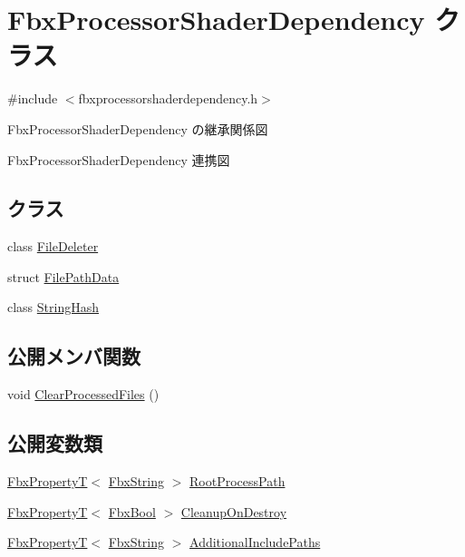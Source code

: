 \hypertarget{class_fbx_processor_shader_dependency}{}\section{Fbx\+Processor\+Shader\+Dependency クラス}
\label{class_fbx_processor_shader_dependency}


{\ttfamily \#include $<$fbxprocessorshaderdependency.\+h$>$}



Fbx\+Processor\+Shader\+Dependency の継承関係図


Fbx\+Processor\+Shader\+Dependency 連携図
\subsection*{クラス}
\begin{DoxyCompactItemize}
\item 
class \hyperlink{class_fbx_processor_shader_dependency_1_1_file_deleter}{File\+Deleter}
\item 
struct \hyperlink{struct_fbx_processor_shader_dependency_1_1_file_path_data}{File\+Path\+Data}
\item 
class \hyperlink{class_fbx_processor_shader_dependency_1_1_string_hash}{String\+Hash}
\end{DoxyCompactItemize}
\subsection*{公開メンバ関数}
\begin{DoxyCompactItemize}
\item 
void \hyperlink{class_fbx_processor_shader_dependency_a3c93c344271aa09caf870e35597a7b6a}{Clear\+Processed\+Files} ()
\end{DoxyCompactItemize}
\subsection*{公開変数類}
\begin{DoxyCompactItemize}
\item 
\hyperlink{class_fbx_property_t}{Fbx\+PropertyT}$<$ \hyperlink{class_fbx_string}{Fbx\+String} $>$ \hyperlink{class_fbx_processor_shader_dependency_a2609315b13014fbba8003185c2e8a5f1}{Root\+Process\+Path}
\item 
\hyperlink{class_fbx_property_t}{Fbx\+PropertyT}$<$ \hyperlink{fbxtypes_8h_a92e0562b2fe33e76a242f498b362262e}{Fbx\+Bool} $>$ \hyperlink{class_fbx_processor_shader_dependency_af0bbb628b8b548365fd7d4325f1d4589}{Cleanup\+On\+Destroy}
\item 
\hyperlink{class_fbx_property_t}{Fbx\+PropertyT}$<$ \hyperlink{class_fbx_string}{Fbx\+String} $>$ \hyperlink{class_fbx_processor_shader_dependency_a2ee0459a8761ec48aa6943cc90442b6a}{Additional\+Include\+Paths}
\end{DoxyCompactItemize}
